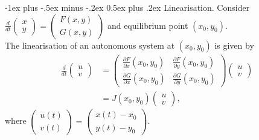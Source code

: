 \documentclass[10pt,landscape,a4paper]{article}
\makeatletter
\renewcommand{\section}{\@startsection{section}{1}{0mm}%
	{-1ex plus -.5ex minus -.2ex}%
	{0.5ex plus .2ex}%
	{\normalfont\large\bfseries}}
\makeatother
\begin{document}
\begin{multicols}{3}
		\section{Linearisation.}
		Consider $ \frac{d}{dt} \begin{pmatrix}x\\y\end{pmatrix} = \begin{pmatrix}F(x,y)\\G(x,y)\end{pmatrix} $ and equilibrium point $ \left(x_0,y_0\right) $.\\
		The linearisation of an autonomous system at $ \left(x_0,y_0\right) $ is given by
		\begin{align*}
			\frac{d}{dt} \begin{pmatrix}u\\v\end{pmatrix} &=
			\begin{pmatrix}
				\frac{\partial F}{\partial x} \left(x_0,y_0\right) & \frac{\partial F}{\partial y} \left(x_0,y_0\right)\\
				\frac{\partial G}{\partial x} \left(x_0,y_0\right) & \frac{\partial G}{\partial y} \left(x_0,y_0\right)
			\end{pmatrix}\begin{pmatrix}u\\v\end{pmatrix}\\
			&= J\left(x_0,y_0\right)\begin{pmatrix}u\\v\end{pmatrix},
		\end{align*}
		where $ \begin{pmatrix}u(t)\\v(t)\end{pmatrix} = \begin{pmatrix}x(t)-x_0\\y(t)-y_0\end{pmatrix} $.
		

\end{multicols}
\end{document}

